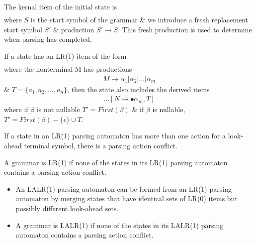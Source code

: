 The kernal item of the initial state is
\begin{align*}
    [S' \rightarrow \bullet S, \$]
\end{align*}
where $S$ is the start symbol of the grammar \& we introduce a fresh replacement start 
symbol $S'$ \& production $S' \rightarrow S$. This fresh production is used to determine 
when parsing has completed.

If a state has an LR(1) item of the form
\begin{align*}
    [N \rightarrow \alpha \bullet M \beta, T]
\end{align*}
where the nonterminal M has productions
\begin{align*}
    M \rightarrow \alpha_1 | \alpha_2 | \dots | \alpha_m
\end{align*}
\& $T = \{a_1, a_2, \dots, a_n\}$, then the state also includes the derived items
\begin{align*}
    [N \rightarrow \bullet \alpha_1, T]
    \dots
    [N \rightarrow \bullet \alpha_m, T]
\end{align*}
where if $\beta$ is not nullable $T' = First(\beta)$ \& if $\beta$ is nullable, 
$T' = First(\beta) - \{\epsilon\} \cup T$.

If a state in an LR(1) parsing automaton has more than one action for a look-ahead 
terminal symbol, there is a parsing action conflict.

A grammar is LR(1) if none of the states in its LR(1) parsing automaton contains a parsing
action conflict.


\begin{itemize}
    \item An LALR(1) parsing automaton can be formed from an LR(1) parsing automaton by 
    merging states that have identical sets of LR(0) items but possibly different look-ahead 
    sets.
    \item A grammar is LALR(1) if none of the states in its LALR(1) parsing automaton contains 
    a parsing action conflict.
\end{itemize}